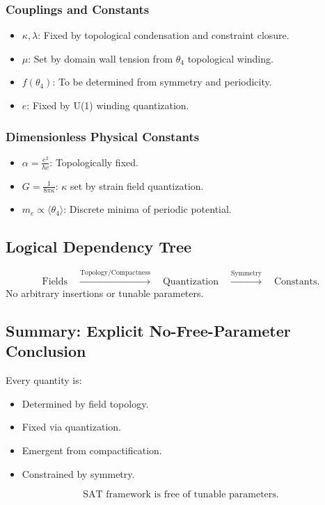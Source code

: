 \documentclass[12pt]{article}
\begin{document}
\subsubsection{Couplings and Constants}

\begin{itemize}
    \item \( \kappa, \lambda \): Fixed by topological condensation and constraint closure.
    \item \( \mu \): Set by domain wall tension from \( \theta_4 \) topological winding.
    \item \( f(\theta_4) \): To be determined from symmetry and periodicity.
    \item \( e \): Fixed by U(1) winding quantization.
\end{itemize}

\subsubsection{Dimensionless Physical Constants}

\begin{itemize}
    \item \( \alpha = \frac{e^2}{\hbar c} \): Topologically fixed.
    \item \( G = \frac{1}{8\pi \kappa} \): \( \kappa \) set by strain field quantization.
    \item \( m_e \propto \langle \theta_4 \rangle \): Discrete minima of periodic potential.
\end{itemize}

\subsection{Logical Dependency Tree}

\[
\text{Fields} \quad \xrightarrow{\text{Topology/Compactness}} \quad \text{Quantization} \quad \xrightarrow{\text{Symmetry}} \quad \text{Constants}.
\]
No arbitrary insertions or tunable parameters.

\subsection{Summary: Explicit No-Free-Parameter Conclusion}

Every quantity is:
\begin{itemize}
    \item Determined by field topology.
    \item Fixed via quantization.
    \item Emergent from compactification.
    \item Constrained by symmetry.
\end{itemize}
\[
\boxed{\text{SAT framework is free of tunable parameters.}}
\]
\end{document}
